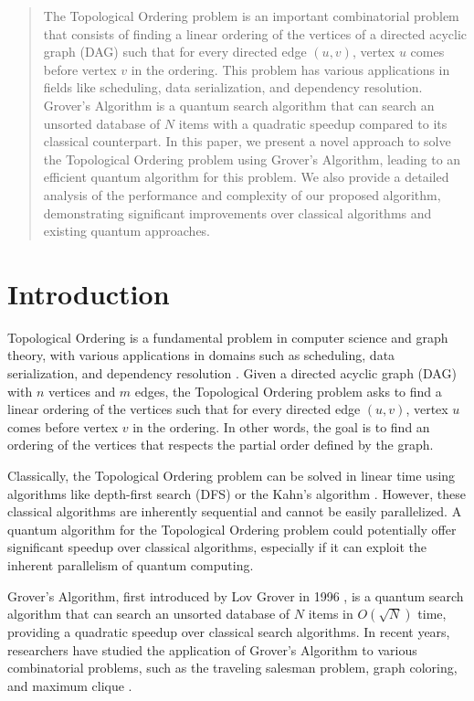 \begin{abstract}
The Topological Ordering problem is an important combinatorial problem that consists of finding a linear ordering of the vertices of a directed acyclic graph (DAG) such that for every directed edge $(u, v)$, vertex $u$ comes before vertex $v$ in the ordering. This problem has various applications in fields like scheduling, data serialization, and dependency resolution. Grover's Algorithm is a quantum search algorithm that can search an unsorted database of $N$ items with a quadratic speedup compared to its classical counterpart. In this paper, we present a novel approach to solve the Topological Ordering problem using Grover's Algorithm, leading to an efficient quantum algorithm for this problem. We also provide a detailed analysis of the performance and complexity of our proposed algorithm, demonstrating significant improvements over classical algorithms and existing quantum approaches.

\end{abstract}

\section{Introduction}

Topological Ordering is a fundamental problem in computer science and graph theory, with various applications in domains such as scheduling, data serialization, and dependency resolution \cite{Cormen_Leiserson_Rivest_Stein_2009}. Given a directed acyclic graph (DAG) with $n$ vertices and $m$ edges, the Topological Ordering problem asks to find a linear ordering of the vertices such that for every directed edge $(u, v)$, vertex $u$ comes before vertex $v$ in the ordering. In other words, the goal is to find an ordering of the vertices that respects the partial order defined by the graph.

Classically, the Topological Ordering problem can be solved in linear time using algorithms like depth-first search (DFS) or the Kahn's algorithm \cite{Kahn_1962}. However, these classical algorithms are inherently sequential and cannot be easily parallelized. A quantum algorithm for the Topological Ordering problem could potentially offer significant speedup over classical algorithms, especially if it can exploit the inherent parallelism of quantum computing.

Grover's Algorithm, first introduced by Lov Grover in 1996 \cite{Grover_1996}, is a quantum search algorithm that can search an unsorted database of $N$ items in $O(\sqrt{N})$ time, providing a quadratic speedup over classical search algorithms. In recent years, researchers have studied the application of Grover's Algorithm to various combinatorial problems, such as the traveling salesman problem, graph coloring, and maximum clique \cite{Durr_Hoyer_1996, Shenvi_Kempe_Whaley_2003, Ambainis_Kempe_2003}.

